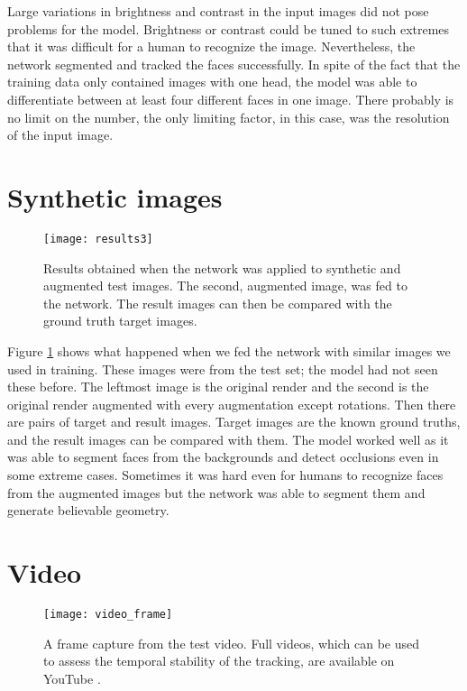 Large variations in brightness and contrast in the input images did not pose problems for the model. Brightness or contrast could be tuned to such extremes that it was difficult for a human to recognize the image. Nevertheless, the network segmented and tracked the faces successfully. In spite of the fact that the training data only contained images with one head, the model was able to differentiate between at least four different faces in one image. There probably is no limit on the number, the only limiting factor, in this case, was the resolution of the input image.

\section{Synthetic images}

\begin{figure}[p]
    \texttt{[image: results3]}
    \caption[Synthetic image results]{Results obtained when the network was applied to synthetic and augmented test images. The second, augmented image, was fed to the network. The result images can then be compared with the ground truth target images.}
    \label{fig:results_3}
\end{figure}

Figure \ref{fig:results_3} shows what happened when we fed the network with similar images we used in training. These images were from the test set; the model had not seen these before. The leftmost image is the original render and the second is the original render augmented with every augmentation except rotations. Then there are pairs of target and result images. Target images are the known ground truths, and the result images can be compared with them. The model worked well as it was able to segment faces from the backgrounds and detect occlusions even in some extreme cases. Sometimes it was hard even for humans to recognize faces from the augmented images but the network was able to segment them and generate believable geometry.

\section{Video}

\begin{figure}
    \texttt{[image: video\_frame]}
    \caption[Video result frame]{A frame capture from the test video. Full videos, which can be used to assess the temporal stability of the tracking, are available on YouTube \cite{uvnet}.}
    \label{fig:video_frame_1}
\end{figure}

